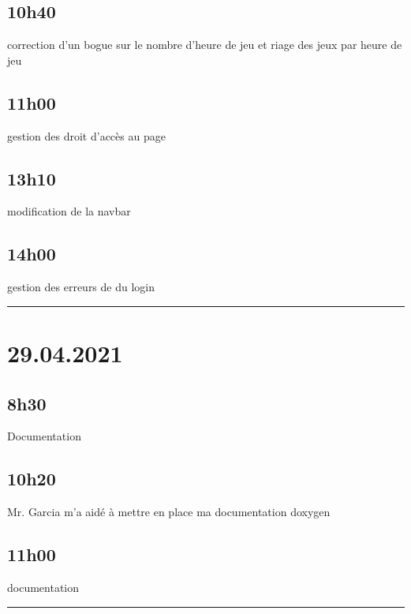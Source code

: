 \documentclass[a4paper,12pt,french]{sphinxmanual}
\begin{document}
\subsection{10h40}
\label{\detokenize{logbook:id44}}
\sphinxAtStartPar
correction d’un bogue sur le nombre d’heure de jeu et riage des jeux par heure de jeu


\subsection{11h00}
\label{\detokenize{logbook:id45}}
\sphinxAtStartPar
gestion des droit d’accès au page


\subsection{13h10}
\label{\detokenize{logbook:id46}}
\sphinxAtStartPar
modification de la navbar


\subsection{14h00}
\label{\detokenize{logbook:id47}}
\sphinxAtStartPar
gestion des erreurs de du login


\bigskip\hrule\bigskip



\section{29.04.2021}
\label{\detokenize{logbook:id48}}

\subsection{8h30}
\label{\detokenize{logbook:id49}}
\sphinxAtStartPar
Documentation


\subsection{10h20}
\label{\detokenize{logbook:id50}}
\sphinxAtStartPar
Mr. Garcia m’a aidé à mettre en place ma documentation doxygen


\subsection{11h00}
\label{\detokenize{logbook:id51}}
\sphinxAtStartPar
documentation


\bigskip\hrule\bigskip
\end{document}
